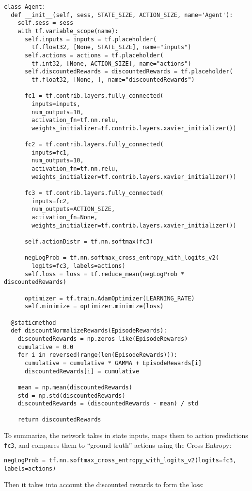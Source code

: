 \documentclass[10pt]{article}
\theoremstyle{plain}
\theoremstyle{definition}
\theoremstyle{remark}
\newcommand{\0}{\varnothing}
\newcommand{\<}{\langle}
\renewcommand{\>}{\rangle}
\begin{document}
\scriptsize
\begin{lstlisting}
class Agent:
  def __init__(self, sess, STATE_SIZE, ACTION_SIZE, name='Agent'):
    self.sess = sess
    with tf.variable_scope(name):
      self.inputs = inputs = tf.placeholder(
        tf.float32, [None, STATE_SIZE], name="inputs")
      self.actions = actions = tf.placeholder(
        tf.int32, [None, ACTION_SIZE], name="actions")
      self.discountedRewards = discountedRewards = tf.placeholder(
        tf.float32, [None, ], name="discountedRewards")

      fc1 = tf.contrib.layers.fully_connected(
        inputs=inputs,
        num_outputs=10,
        activation_fn=tf.nn.relu,
        weights_initializer=tf.contrib.layers.xavier_initializer())

      fc2 = tf.contrib.layers.fully_connected(
        inputs=fc1,
        num_outputs=10,
        activation_fn=tf.nn.relu,
        weights_initializer=tf.contrib.layers.xavier_initializer())

      fc3 = tf.contrib.layers.fully_connected(
        inputs=fc2,
        num_outputs=ACTION_SIZE,
        activation_fn=None,
        weights_initializer=tf.contrib.layers.xavier_initializer())

      self.actionDistr = tf.nn.softmax(fc3)

      negLogProb = tf.nn.softmax_cross_entropy_with_logits_v2(
        logits=fc3, labels=actions)
      self.loss = loss = tf.reduce_mean(negLogProb * discountedRewards)

      optimizer = tf.train.AdamOptimizer(LEARNING_RATE)
      self.minimize = optimizer.minimize(loss)

  @staticmethod
  def discountNormalizeRewards(EpisodeRewards):
    discountedRewards = np.zeros_like(EpisodeRewards)
    cumulative = 0.0
    for i in reversed(range(len(EpisodeRewards))):
      cumulative = cumulative * GAMMA + EpisodeRewards[i]
      discountedRewards[i] = cumulative

    mean = np.mean(discountedRewards)
    std = np.std(discountedRewards)
    discountedRewards = (discountedRewards - mean) / std

    return discountedRewards
\end{lstlisting}
\normalsize

To summarize, the network takes in state inputs, maps them to action predictions \lstinline{fc3}, and compares them to ``ground truth'' actions using the Cross Entropy:

\tiny
\begin{lstlisting}
negLogProb = tf.nn.softmax_cross_entropy_with_logits_v2(logits=fc3, labels=actions)
\end{lstlisting}
\normalsize
Then it takes into account the discounted rewards to form the loss:
\end{document}
